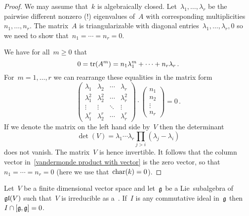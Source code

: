 \begin{proof}
  We may assume that~$k$ is algebraically closed.
  Let~$\lambda_1, \dotsc, \lambda_r$ be the pairwise different nonzero (!) eigenvalues of~$A$ with corresponding multiplicities~$n_1, \dotsc, n_r$.
  The matrix~$A$ is triangularizable with diagonal entries~$\lambda_1, \dotsc, \lambda_r, 0$ so we need to show that~$n_1 = \dotsb = n_r = 0$.
  
  We have for all~$m \geq 0$ that
  \[
    0
    =
    \operatorname{tr}(A^m)
    =
    n_1 \lambda_1^m + \dotsb + n_r \lambda_r  \,.
  \]
  For~$m = 1, \dotsc, r$ we can rearrange these equalities in the matrix form
  \begin{equation}
    \label{vandermonde product with vector}
    \begin{pmatrix}
      \lambda_1   & \lambda_2   & \cdots  & \lambda_r   \\
      \lambda_1^2 & \lambda_2^2 & \cdots  & \lambda_r^2 \\
      \vdots      & \vdots      & \ddots  & \vdots      \\
      \lambda_1^r & \lambda_2^r & \cdots  & \lambda_r^r
    \end{pmatrix}
    \cdot
    \begin{pmatrix}
      n_1     \\
      n_2     \\
      \vdots  \\
      n_r
    \end{pmatrix}
    =
    0 \,.
  \end{equation}
  If we denote the matrix on the left hand side by~$V$ then the determinant
  \[
    \det(V)
    =
    \lambda_1 \dotsm \lambda_r \prod_{j > i} (\lambda_j - \lambda_i)
  \]
  does not vanish.
  The matrix~$V$ is hence invertible.
  It follows that the column vector in~\eqref{vandermonde product with vector} is the zero vector, so that~$n_1 = \dotsb = n_r = 0$ (here we use that~$\operatorname{char}(k) = 0$).
\end{proof}

\begin{lemma}
  \label{technical lemma}
  Let~$V$ be a finite dimensional vector space and let~$\glie$ be a Lie~subalgebra of~$\mathfrak{gl}(V)$ such that~$V$ is irreducible as a~{\representation{$\glie$}}.
  If~$I$ is any commutative ideal in~$\glie$ then~$I \cap [\mathfrak{g}, \mathfrak{g}] = 0$.
\end{lemma}

